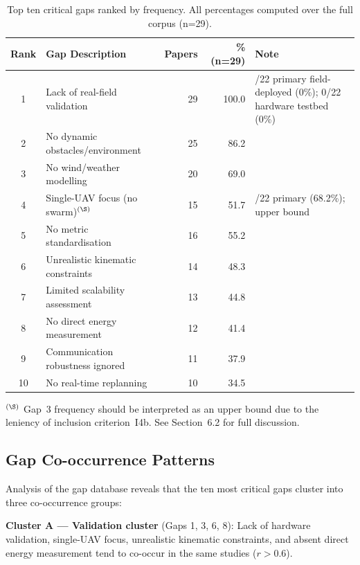 \documentclass[review,3p]{elsarticle}
\begin{document}
\begin{table}[htbp]
\centering
\caption{Top ten critical gaps ranked by frequency. All percentages computed
over the full corpus (n=29).}
\label{tab:top10}
\begin{tabular}{clrr>{\raggedright\arraybackslash}p{5cm}}
\toprule
\textbf{Rank} & \textbf{Gap Description} & \textbf{Papers} & \textbf{\% (n=29)} & \textbf{Note} \\
\midrule
1  & Lack of real-field validation        & 29 & 100.0 & 0/22 primary field-deployed (0\%); 0/22 hardware testbed (0\%) \\
2  & No dynamic obstacles/environment     & 25 & 86.2  & \\
3  & No wind/weather modelling            & 20 & 69.0  & \\
4  & Single-UAV focus (no swarm)$^{(\S)}$ & 15 & 51.7  & 15/22 primary (68.2\%); upper bound \\
5  & No metric standardisation            & 16 & 55.2  & \\
6  & Unrealistic kinematic constraints    & 14 & 48.3  & \\
7  & Limited scalability assessment       & 13 & 44.8  & \\
8  & No direct energy measurement         & 12 & 41.4  & \\
9  & Communication robustness ignored     & 11 & 37.9  & \\
10 & No real-time replanning              & 10 & 34.5  & \\
\bottomrule
\end{tabular}
\begin{minipage}{0.96\textwidth}
\scriptsize\medskip
$^{(\S)}$ Gap~3 frequency should be interpreted as an upper bound due to the
leniency of inclusion criterion~I4b. See Section~6.2 for full discussion.
\end{minipage}
\end{table}

\subsection{Gap Co-occurrence Patterns}

Analysis of the gap database reveals that the ten most critical gaps cluster
into three co-occurrence groups:

\textbf{Cluster A --- Validation cluster} (Gaps 1, 3, 6, 8): Lack of hardware
validation, single-UAV focus, unrealistic kinematic constraints, and absent
direct energy measurement tend to co-occur in the same studies ($r > 0.6$).
\end{document}

